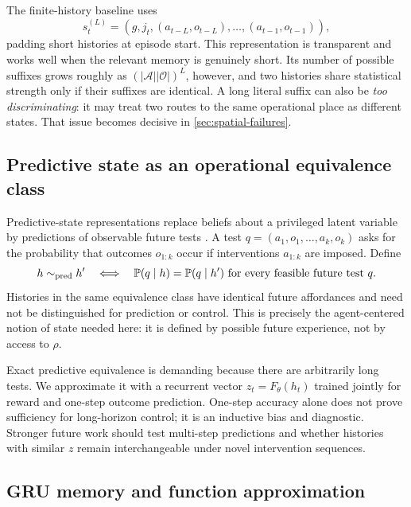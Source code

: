 \documentclass[11pt]{article}
\newcommand{\Prob}{\mathbb P}
\begin{document}
The finite-history baseline uses
\begin{equation}
 s_t^{(L)}=(g,j_t,(a_{t-L},o_{t-L}),\ldots,(a_{t-1},o_{t-1})),
 \label{eq:tabstate}
\end{equation}
padding short histories at episode start. This representation is transparent
and works well when the relevant memory is genuinely short. Its number of
possible suffixes grows roughly as $(|\mathcal A||\mathcal O|)^L$, however,
and two histories share statistical strength only if their suffixes are
identical. A long literal suffix can also be \emph{too discriminating}: it may
treat two routes to the same operational place as different states. That issue
becomes decisive in \cref{sec:spatial-failures}.

\subsection{Predictive state as an operational equivalence class}

Predictive-state representations replace beliefs about a privileged latent
variable by predictions of observable future tests \cite{littman2001}. A test
$q=(a_1,o_1,\ldots,a_k,o_k)$ asks for the probability that outcomes
$o_{1:k}$ occur if interventions $a_{1:k}$ are imposed. Define
\begin{equation}
 h\sim_{\rm pred}h'
 \quad\Longleftrightarrow\quad
 \Prob(q\mid h)=\Prob(q\mid h')\ \text{for every feasible future test }q.
 \label{eq:predictive-equivalence}
\end{equation}
Histories in the same equivalence class have identical future affordances and
need not be distinguished for prediction or control. This is precisely the
agent-centered notion of state needed here: it is defined by possible future
experience, not by access to $\rho$.

Exact predictive equivalence is demanding because there are arbitrarily long
tests. We approximate it with a recurrent vector $z_t=F_\theta(h_t)$ trained
jointly for reward and one-step outcome prediction. One-step accuracy alone
does not prove sufficiency for long-horizon control; it is an inductive bias and
diagnostic. Stronger future work should test multi-step predictions and whether
histories with similar $z$ remain interchangeable under novel intervention
sequences.

\subsection{GRU memory and function approximation}
\end{document}
